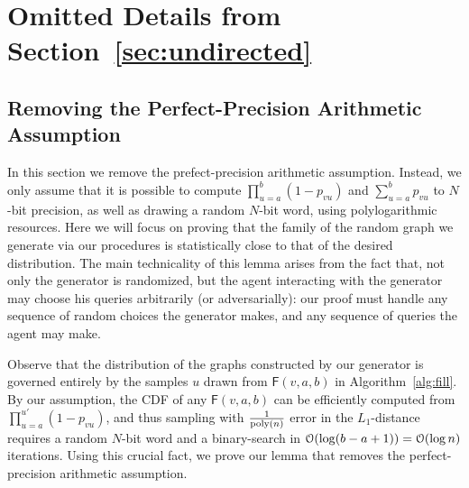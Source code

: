 \section{Omitted Details from Section~\ref{sec:undirected}}
\label{sec:undirected_omitted}


\subsection{Removing the Perfect-Precision Arithmetic Assumption}
\label{sec:remove-perfect}

In this section we remove the prefect-precision arithmetic assumption. Instead, we only assume that it is possible to compute $\prod_{u=a}^b (1-p_{vu})$ and $\sum_{u=a}^b p_{vu}$ to $N$-bit precision, as well as drawing a random $N$-bit word, using polylogarithmic resources. Here we will focus on proving that the family of the random graph we generate via our procedures is statistically close to that of the desired distribution. The main technicality of this lemma arises from the fact that, not only the generator is randomized, but the agent interacting with the generator may choose his queries arbitrarily (or adversarially): our proof must handle any sequence of random choices the generator makes, and any sequence of queries the agent may make.

Observe that the distribution of the graphs constructed by our generator is governed entirely by the samples $u$ drawn from $\mathsf{F}(v,a,b)$ in Algorithm~\ref{alg:fill}. By our assumption, the CDF of any $\mathsf{F}(v,a,b)$ can be efficiently computed from $\prod_{u=a}^{u'} (1-p_{vu})$, and thus sampling with $\frac{1}{\mathrm{poly}(n)}$ error in the $L_1$-distance requires a random $N$-bit word and a binary-search in $\mathcal{O}(\log (b-a+1)) = \mathcal{O}(\log n)$ iterations. Using this crucial fact, we prove our lemma that removes the perfect-precision arithmetic assumption.


